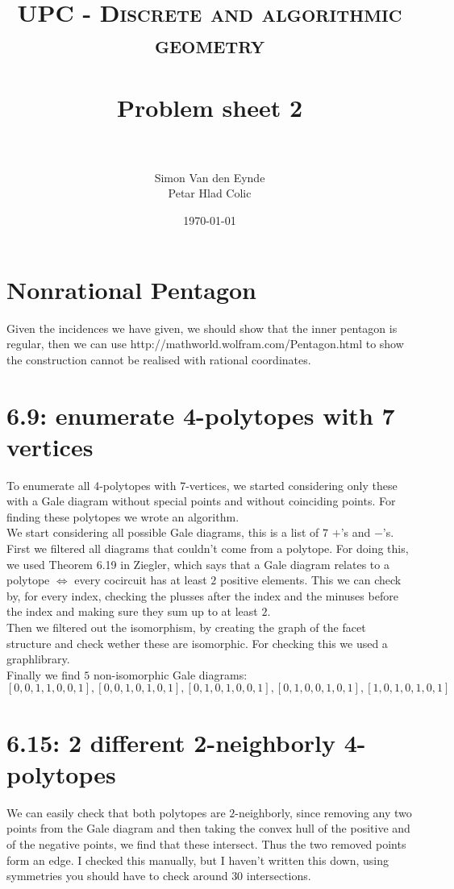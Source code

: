 \documentclass[paper=a4, fontsize=11pt]{scrartcl} %
\title{	
\normalfont \normalsize 
\textsc{UPC - Discrete and algorithmic geometry} \\ [25pt] %
\horrule{0.5pt} \\[0.4cm] %
\huge Problem sheet 2  \\ %
\horrule{2pt} \\[0.5cm] %
}
\author{Simon Van den Eynde \\ Petar Hlad Colic} %
\date{\normalsize\today} %
\theoremstyle{plain}
\begin{document}
\maketitle %

\section{Nonrational Pentagon}
Given the incidences we have given, we should show that the inner pentagon is regular, then we can use http://mathworld.wolfram.com/Pentagon.html to show the construction cannot be realised with rational coordinates.

\section{6.9: enumerate 4-polytopes with 7 vertices}

To enumerate all 4-polytopes with 7-vertices, we started considering only these with a Gale diagram without special points and without coinciding points. For finding these polytopes we wrote an algorithm.\\

We start considering all possible Gale diagrams, this is a list of $7$ $+$'s and $-$'s. First we filtered all diagrams that couldn't come from a polytope. For doing this, we used Theorem 6.19 in Ziegler, which says that a Gale diagram relates to a polytope $\iff$ every cocircuit has at least $2$ positive elements. This we can check by, for every index, checking the plusses after the index and the minuses before the index and making sure they sum up to at least $2$.\\

Then we filtered out the isomorphism, by creating the graph of the facet structure and check wether these are isomorphic. For checking this we used a graphlibrary.\\

Finally we find $5$ non-isomorphic Gale diagrams:
\[[0, 0, 1, 1, 0, 0, 1],
 [0, 0, 1, 0, 1, 0, 1],
 [0, 1, 0, 1, 0, 0, 1],
 [0, 1, 0, 0, 1, 0, 1],
 [1, 0, 1, 0, 1, 0, 1]\]
 


\section{6.15: 2 different 2-neighborly 4-polytopes}
We can easily check that both polytopes are $2$-neighborly, since removing any two points from the Gale diagram and then taking the convex hull of the positive and of the negative points, we find that these intersect. Thus the two removed points form an edge. I checked this manually, but I haven't written this down, using symmetries you should have to check around $30$ intersections.\\
\end{document}
